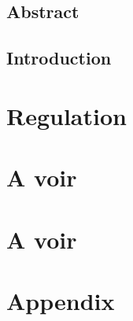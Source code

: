 \documentclass[12pt,fleqn]{report} %
\begin{document}
\renewcommand{\contentsname}{Contents}                %
\renewcommand{\bibname}{Bibliography}  %



\tableofcontents  %
\cleardoublepage  %

\chapter*{Abstract}


\chapter*{Introduction}



\part{Regulation}


\part{A voir}



\part{A voir}





\appendix
\part{Appendix}



%
\nocite{*}




\end{document}
